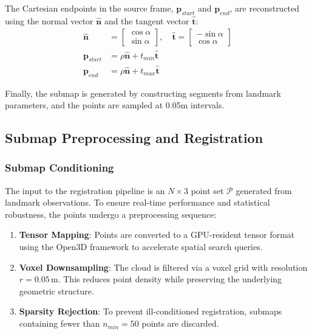 \documentclass[11pt]{article}
\begin{document}
The Cartesian endpoints in the source frame, $\mathbf{p}_{start}$ and $\mathbf{p}_{end}$, are reconstructed using the normal vector $\mathbf{\hat{n}}$ and the tangent vector $\mathbf{\hat{t}}$:
\begin{align}
	\mathbf{\hat{n}} &= \begin{bmatrix} \cos\alpha \\ \sin\alpha \end{bmatrix}, \quad \mathbf{\hat{t}} = \begin{bmatrix} -\sin\alpha \\ \cos\alpha \end{bmatrix} \\
	\mathbf{p}_{start} &= \rho\mathbf{\hat{n}} + t_{min}\mathbf{\hat{t}} \\
	\mathbf{p}_{end} &= \rho\mathbf{\hat{n}} + t_{max}\mathbf{\hat{t}}
\end{align}

Finally, the submap is generated by constructing segments from landmark parameters, and the points are sampled at 0.05m intervals.


\subsection{Submap Preprocessing and Registration}

\subsubsection{Submap Conditioning}
The input to the registration pipeline is an $N \times 3$ point set $\mathcal{P}$ generated from landmark observations. To ensure real-time performance and statistical robustness, the points undergo a preprocessing sequence:

\begin{enumerate}
	\item \textbf{Tensor Mapping}: Points are converted to a GPU-resident tensor format using the Open3D framework to accelerate spatial search queries.
	\item \textbf{Voxel Downsampling}: The cloud is filtered via a voxel grid with resolution $r = 0.05\,\text{m}$. This reduces point density while preserving the underlying geometric structure.
	\item \textbf{Sparsity Rejection}: To prevent ill-conditioned registration, submaps containing fewer than $n_{min} = 50$ points are discarded.
\end{enumerate}
\end{document}
